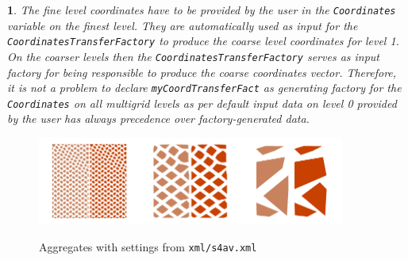 \documentclass[10pt,fleqn]{book}
\newtheorem*{mycomment}{\ding{42}}
\begin{document}
\begin{mycomment}
The fine level coordinates have to be provided by the user in the \verb|Coordinates| variable on the finest level. They are automatically used as input for the \verb|CoordinatesTransferFactory| to produce the coarse level coordinates for level 1. On the coarser levels then the \verb|CoordinatesTransferFactory| serves as input factory for being responsible to produce the coarse coordinates vector. Therefore, it is not a problem to declare \verb|myCoordTransferFact| as generating factory for the \verb|Coordinates| on all multigrid levels as per default input data on level 0 provided by the user has always precedence over factory-generated data.
\end{mycomment}

\begin{figure}
\centering
\includegraphics[width=0.3\textwidth]{pics/s4al1.png}\includegraphics[width=0.3\textwidth]{pics/s4al2.png}\includegraphics[width=0.3\textwidth]{pics/s4al3.png}
\caption{Aggregates with settings from \texttt{xml/s4av.xml}}
\label{fig:diffaggregates}
\end{figure}
\end{document}
